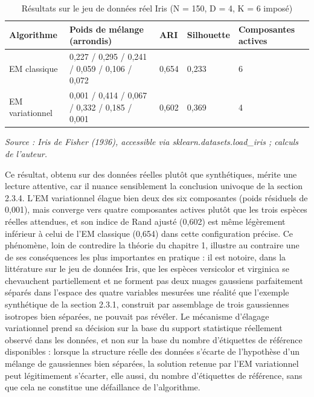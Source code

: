 \begin{table}[H]
\centering
\small
\setlength{\tabcolsep}{0.14cm}
\begin{tabular}{|p{2.77cm}|p{2.77cm}|p{2.77cm}|p{2.77cm}|p{2.77cm}|}
\hline
\textbf{Algorithme} & \textbf{Poids de mélange (arrondis)} & \textbf{ARI} & \textbf{Silhouette} & \textbf{Composantes actives} \\
\hline
EM classique & 0,227 / 0,295 / 0,241 / 0,059 / 0,106 / 0,072 & 0,654 & 0,233 & 6 \\
\hline
EM variationnel & 0,001 / 0,414 / 0,067 / 0,332 / 0,185 / 0,001 & 0,602 & 0,369 & 4 \\
\hline
\end{tabular}
\caption{Résultats sur le jeu de données réel Iris (N = 150, D = 4, K = 6 imposé)}
\label{tab:2_13}
\end{table}
\emph{Source : Iris de Fisher (1936), accessible via sklearn.datasets.load\_iris ; calculs de l'auteur.}

Ce résultat, obtenu sur des données réelles plutôt que synthétiques, mérite une lecture attentive, car il nuance sensiblement la conclusion univoque de la section 2.3.4. L'EM variationnel élague bien deux des six composantes (poids résiduels de 0,001), mais converge vers quatre composantes actives plutôt que les trois espèces réelles attendues, et son indice de Rand ajusté (0,602) est même légèrement inférieur à celui de l'EM classique (0,654) dans cette configuration précise. Ce phénomène, loin de contredire la théorie du chapitre 1, illustre au contraire une de ses conséquences les plus importantes en pratique : il est notoire, dans la littérature sur le jeu de données Iris, que les espèces versicolor et virginica se chevauchent partiellement et ne forment pas deux nuages gaussiens parfaitement séparés dans l'espace des quatre variables mesurées  une réalité que l'exemple synthétique de la section 2.3.1, construit par assemblage de trois gaussiennes isotropes bien séparées, ne pouvait pas révéler. Le mécanisme d'élagage variationnel prend sa décision sur la base du support statistique réellement observé dans les données, et non sur la base du nombre d'étiquettes de référence disponibles : lorsque la structure réelle des données s'écarte de l'hypothèse d'un mélange de gaussiennes bien séparées, la solution retenue par l'EM variationnel peut légitimement s'écarter, elle aussi, du nombre d'étiquettes de référence, sans que cela ne constitue une défaillance de l'algorithme.

